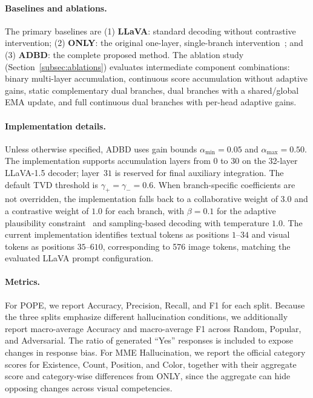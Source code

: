 \paragraph{Baselines and ablations.}
The primary baselines are (1) \textbf{LLaVA}: standard decoding without contrastive intervention; (2) \textbf{ONLY}: the original one-layer, single-branch intervention~\cite{wan2025only}; and (3) \textbf{ADBD}: the complete proposed method. The ablation study (Section~\ref{subsec:ablations}) evaluates intermediate component combinations: binary multi-layer accumulation, continuous score accumulation without adaptive gains, static complementary dual branches, dual branches with a shared/global EMA update, and full continuous dual branches with per-head adaptive gains.

\paragraph{Implementation details.}
Unless otherwise specified, ADBD uses gain bounds $\alpha_{\min}=0.05$ and $\alpha_{\max}=0.50$. The implementation supports accumulation layers from $0$ to $30$ on the 32-layer LLaVA-1.5 decoder; layer~$31$ is reserved for final auxiliary integration. The default TVD threshold is $\gamma_{+}=\gamma_{-}=0.6$. When branch-specific coefficients are not overridden, the implementation falls back to a collaborative weight of $3.0$ and a contrastive weight of $1.0$ for each branch, with $\beta=0.1$ for the adaptive plausibility constraint~\cite{li2023contrastive} and sampling-based decoding with temperature $1.0$. The current implementation identifies textual tokens as positions $1$--$34$ and visual tokens as positions $35$--$610$, corresponding to 576 image tokens, matching the evaluated LLaVA prompt configuration.

\paragraph{Metrics.}
For POPE, we report Accuracy, Precision, Recall, and F1 for each split. Because the three splits emphasize different hallucination conditions, we additionally report macro-average Accuracy and macro-average F1 across Random, Popular, and Adversarial. The ratio of generated ``Yes'' responses is included to expose changes in response bias. For MME Hallucination, we report the official category scores for Existence, Count, Position, and Color, together with their aggregate score and category-wise differences from ONLY, since the aggregate can hide opposing changes across visual competencies.

